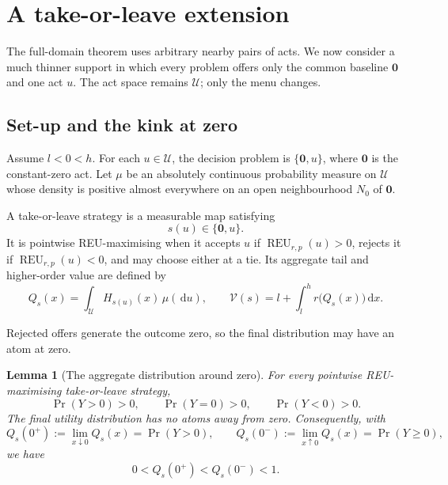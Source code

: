 \documentclass[11pt,a4paper]{article}
\newtheorem{lemma}[lemma]{Lemma}
\theoremstyle{definition}
\newcommand{\REU}{\operatorname{REU}}
\newcommand{\V}{\mathcal V}
\newcommand{\U}{\mathcal U}
\newcommand{\dd}{\,\mathrm d}
\newcommand{\zero}{\mathbf 0}
\begin{document}
\section{A take-or-leave extension}

The full-domain theorem uses arbitrary nearby pairs of acts. We now consider a
much thinner support in which every problem offers only the common baseline
$\zero$ and one act $u$. The act space remains $\U$; only the menu changes.

\subsection{Set-up and the kink at zero}

Assume $l<0<h$. For each $u\in\U$, the decision problem is $\{\zero,u\}$,
where $\zero$ is the constant-zero act. Let $\mu$ be an absolutely continuous
probability measure on $\U$ whose density is positive almost everywhere on an
open neighbourhood $N_0$ of $\zero$.

A take-or-leave strategy is a measurable map satisfying
\[
 s(u)\in\{\zero,u\}.
\]
It is pointwise REU-maximising when it accepts $u$ if
$\REU_{r,p}(u)>0$, rejects it if $\REU_{r,p}(u)<0$, and may choose either at a
tie. Its aggregate tail and higher-order value are defined by
\[
 Q_s(x)=\int_\U H_{s(u)}(x)\,\mu(\dd u),
 \qquad
 \V(s)=l+\int_l^h r\bigl(Q_s(x)\bigr)\dd x.
\]

Rejected offers generate the outcome zero, so the final distribution may have
an atom at zero.

\begin{lemma}[The aggregate distribution around zero]\label{lem:zero-mass}
For every pointwise REU-maximising take-or-leave strategy,
\[
 \Pr(Y>0)>0,
 \qquad
 \Pr(Y=0)>0,
 \qquad
 \Pr(Y<0)>0.
\]
The final utility distribution has no atoms away from zero. Consequently, with
\[
 Q_s(0^+):=\lim_{x\downarrow0}Q_s(x)=\Pr(Y>0),
 \qquad
 Q_s(0^-):=\lim_{x\uparrow0}Q_s(x)=\Pr(Y\geq0),
\]
we have
\begin{equation}\label{eq:zero-tail-inequalities}
 0<Q_s(0^+)<Q_s(0^-)<1.
\end{equation}
\end{lemma}
\end{document}
